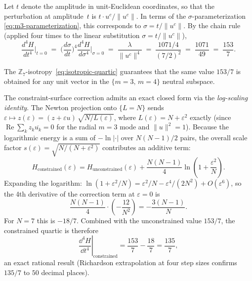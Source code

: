 Let $t$ denote the amplitude in unit-Euclidean coordinates,
so that the perturbation at amplitude~$t$ is
$t \cdot u^c/\|u^c\|$.  In terms of the
$\sigma$-parameterization \eqref{eq:m3-parameterization},
this corresponds to $\sigma = t/\|u^c\|$.  By the chain rule
(applied four times to the linear substitution $\sigma =
t/\|u^c\|$),
\begin{equation}\label{eq:quartic-153}
  \frac{d^4 H}{dt^4}\bigg|_{t = 0}
  \;=\; \biggl(\frac{d\sigma}{dt}\biggr)^{4}
    \frac{d^4 H}{d\sigma^4}\bigg|_{\sigma = 0}
  \;=\; \frac{\lambda}{\|u^c\|^4}
  \;=\; \frac{1071/4}{(7/2)^2}
  \;=\; \frac{1071}{49}
  \;=\; \frac{153}{7}.
\end{equation}

The $\mathbb{Z}_7$-isotropy~\eqref{eq:isotropic-quartic} guarantees
that the same value $153/7$ is obtained for any unit vector in
the $\{m = 3,\, m = 4\}$ neutral subspace.

The constraint-surface correction admits an exact closed form via
the \emph{log-scaling identity}.  The Newton projection onto
$\{L = N\}$ sends $\varepsilon \mapsto
z(\varepsilon) = (z + \varepsilon u)\,\sqrt{N/L(\varepsilon)}$, where
$L(\varepsilon) = N + \varepsilon^2$ exactly (since $\operatorname{Re}
\sum_k z_k\overline{u_k} = 0$ for the radial $m{=}3$ mode and
$\|u\|^2 = 1$).  Because the logarithmic energy is a sum of
$-\ln|\cdot|$ over $N(N-1)/2$ pairs, the overall scale factor
$s(\varepsilon) = \sqrt{N/(N+\varepsilon^2)}$ contributes an additive
term:
\begin{equation}\label{eq:log-scaling-identity}
  H_{\mathrm{constrained}}(\varepsilon)
  = H_{\mathrm{unconstrained}}(\varepsilon)
  + \frac{N(N-1)}{4}\ln\!\left(1 + \frac{\varepsilon^2}{N}\right).
\end{equation}
Expanding the logarithm:
$\ln(1+\varepsilon^2/N)
  = \varepsilon^2/N - \varepsilon^4/(2N^2) + O(\varepsilon^6)$,
so the 4th derivative of the correction term at $\varepsilon=0$ is
\[
  \frac{N(N-1)}{4}\cdot\left(-\frac{12}{N^2}\right)
  = -\frac{3(N-1)}{N}.
\]
For $N=7$ this is $-18/7$.  Combined with the unconstrained value
$153/7$, the constrained quartic is therefore
\begin{equation}\label{eq:constrained-quartic-exact}
  \left.\frac{\dd^4 H}{\dd t^4}\right|_{\text{constrained}}
  = \frac{153}{7} - \frac{18}{7} = \frac{135}{7},
\end{equation}
an exact rational result
(Richardson extrapolation at four step sizes confirms $135/7$ to $50$ decimal places).

